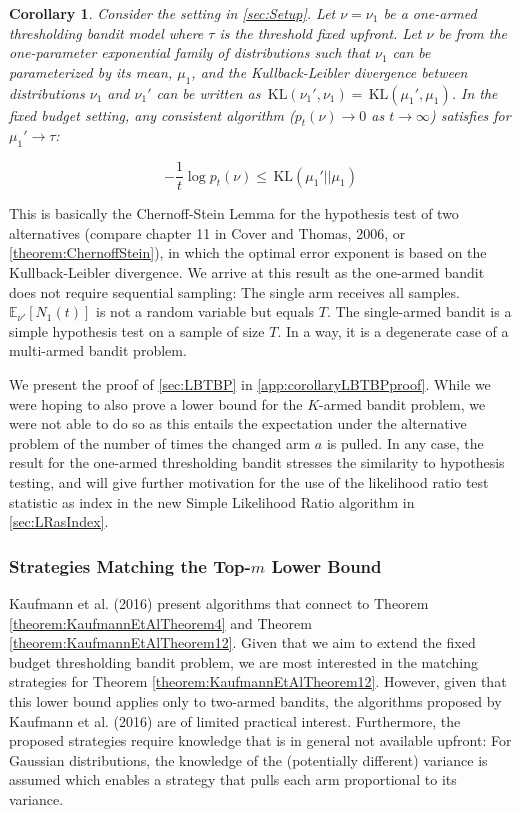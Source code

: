 \documentclass[11pt,]{article}
\newtheorem{corollary}{Corollary}
\newcommand{\KL}{\,\text{KL}}
\begin{document}
\begin{corollary}
Consider the setting in \autoref{sec:Setup}. Let $\nu = \nu_1$ be a one-armed thresholding bandit model where $\tau$ is the threshold fixed upfront. Let $\nu$ be from the one-parameter exponential family of distributions such that $\nu_1$ can be parameterized by its mean, $\mu_1$, and the Kullback-Leibler divergence between distributions $\nu_1$ and $\nu_1'$ can be written as $\KL(\nu_1', \nu_1) = \KL(\mu_1', \mu_1)$. In the fixed budget setting, any consistent algorithm ($p_t(\nu) \rightarrow 0$ as $t \rightarrow \infty$) satisfies for $\mu_1' \rightarrow \tau$:

$$
- \frac{1}{t} \log p_t(\nu) \leq \KL(\mu_1' || \mu_1)
$$
\end{corollary}

\label{corollary:LB1TBP}

This is basically the Chernoff-Stein Lemma for the hypothesis test of
two alternatives (compare chapter 11 in Cover and Thomas, 2006, or
\autoref{theorem:ChernoffStein}), in which the optimal error exponent is
based on the Kullback-Leibler divergence. We arrive at this result as
the one-armed bandit does not require sequential sampling: The single
arm receives all samples. \(\mathbb{E}_{\nu'}[N_1(t)]\) is not a random
variable but equals \(T\). The single-armed bandit is a simple
hypothesis test on a sample of size \(T\). In a way, it is a degenerate
case of a multi-armed bandit problem.

We present the proof of \autoref{sec:LBTBP} in
\autoref{app:corollaryLBTBPproof}. While we were hoping to also prove a
lower bound for the \(K\)-armed bandit problem, we were not able to do
so as this entails the expectation under the alternative problem of the
number of times the changed arm \(a\) is pulled. In any case, the result
for the one-armed thresholding bandit stresses the similarity to
hypothesis testing, and will give further motivation for the use of the
likelihood ratio test statistic as index in the new Simple Likelihood
Ratio algorithm in \autoref{sec:LRasIndex}.

\subsubsection{\texorpdfstring{Strategies Matching the Top-\(m\) Lower
Bound}{Strategies Matching the Top-m Lower Bound}}\label{strategies-matching-the-top-m-lower-bound}

Kaufmann et al. (2016) present algorithms that connect to Theorem
\ref{theorem:KaufmannEtAlTheorem4} and Theorem
\ref{theorem:KaufmannEtAlTheorem12}. Given that we aim to extend the
fixed budget thresholding bandit problem, we are most interested in the
matching strategies for Theorem \ref{theorem:KaufmannEtAlTheorem12}.
However, given that this lower bound applies only to two-armed bandits,
the algorithms proposed by Kaufmann et al. (2016) are of limited
practical interest. Furthermore, the proposed strategies require
knowledge that is in general not available upfront: For Gaussian
distributions, the knowledge of the (potentially different) variance is
assumed which enables a strategy that pulls each arm proportional to its
variance.
\end{document}
